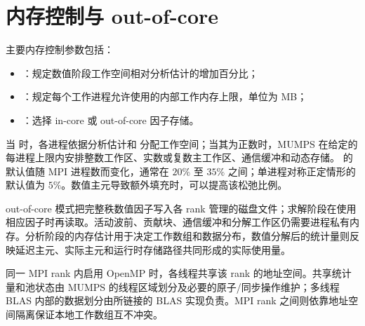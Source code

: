 \section{内存控制与 out-of-core}

主要内存控制参数包括：

\begin{itemize}
  \item {}：规定数值阶段工作空间相对分析估计的增加百分比；
  \item {}：规定每个工作进程允许使用的内部工作内存上限，单位为 MB；
  \item {}：选择 in-core 或 out-of-core 因子存储。
\end{itemize}

当  时，各进程依据分析估计和  分配工作空间；当其为正数时，MUMPS 在给定的每进程上限内安排整数工作区、实数或复数主工作区、通信缓冲和动态存储。 的默认值随 MPI 进程数而变化，通常在 $20\%$ 至 $35\%$ 之间；单进程对称正定情形的默认值为 $5\%$。数值主元导致额外填充时，可以提高该松弛比例\cite{mumpsguide}。

out-of-core 模式把完整秩数值因子写入各 rank 管理的磁盘文件；求解阶段在使用相应因子时再读取。活动波前、贡献块、通信缓冲和分解工作区仍需要进程私有内存。分析阶段的内存估计用于决定工作数组和数据分布，数值分解后的统计量则反映延迟主元、实际主元和运行时存储路径共同形成的实际使用量。

同一 MPI rank 内启用 OpenMP 时，各线程共享该 rank 的地址空间。共享统计量和池状态由 MUMPS 的线程区域划分及必要的原子/同步操作维护；多线程 BLAS 内部的数据划分由所链接的 BLAS 实现负责。MPI rank 之间则依靠地址空间隔离保证本地工作数组互不冲突。
